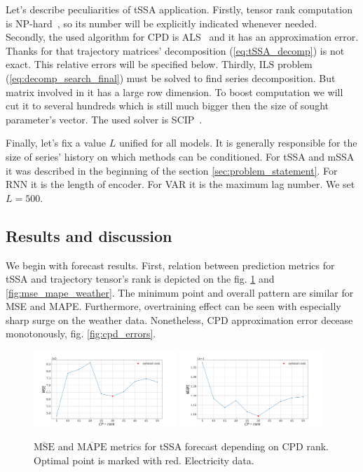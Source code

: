 	Let's describe peculiarities of tSSA application. Firstly, tensor rank computation is NP-hard~\cite{HASTAD1990644}, so its number will be explicitly indicated whenever needed. Secondly, the used algorithm for CPD is ALS~\cite{kolda_tensors} and it has an approximation error. Thanks for that trajectory matrices' decomposition (\ref{eq:tSSA_decomp}) is not exact. This relative errors will be specified below. Thirdly, ILS problem (\ref{eq:decomp_search_final}) must be solved to find series decomposition. But matrix involved in it has a large row dimension. To boost computation we will cut it to several hundreds which is still much bigger then the size of sought parameter's vector. The used solver is SCIP~\cite{BolusaniEtal2024ZR}.

	Finally, let's fix a value $ L $ unified for all models. It is generally responsible for the size of series' history on which methods can be conditioned. For tSSA and mSSA it was described in the beginning of the section \ref{sec:problem_statement}. For RNN it is the length of encoder. For VAR it is the maximum lag number. We set $ L = 500 $.
	
	\subsection*{Results and discussion}
	
	We begin with forecast results. First, relation between prediction metrics for tSSA and trajectory tensor's rank is depicted on the fig. \ref{fig:mse_mape_electr} and \ref{fig:mse_mape_weather}. The minimum point and overall pattern are similar for MSE and MAPE. Furthermore, overtraining effect can be seen with especially sharp surge on the weather data. Nonetheless, CPD approximation error decease monotonously, fig. \ref{fig:cpd_errors}.
	
	\begin{figure}[h]
		\centering
		\includegraphics[width=0.48\textwidth, keepaspectratio]{../../experiments/electricity/tssa/figs/prediction/MSE_rank.png}
		\includegraphics[width=0.48\textwidth, keepaspectratio]{../../experiments/electricity/tssa/figs/prediction/MAPE_rank.png}
		\caption{$ \overline{\text{MSE}} $ and $ \overline{\text{MAPE}} $ metrics for tSSA forecast depending on CPD rank. Optimal point is marked with red. Electricity data.}\label{fig:mse_mape_electr}
	\end{figure}
	
